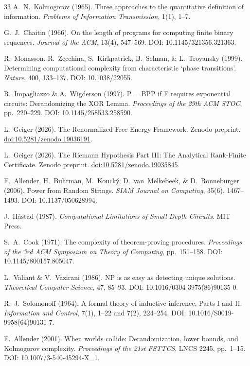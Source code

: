 \documentclass[aps,prd,twocolumn,superscriptaddress,nofootinbib]{revtex4-2}
\theoremstyle{definition}
\theoremstyle{remark}
\begin{document}
\begin{thebibliography}{33}
A.~N.~Kolmogorov (1965).
Three approaches to the quantitative definition of information.
\textit{Problems of Information Transmission}, 1(1), 1--7.

G.~J.~Chaitin (1966).
On the length of programs for computing finite binary sequences.
\textit{Journal of the ACM}, 13(4), 547--569.
DOI: 10.1145/321356.321363.

R.~Monasson, R.~Zecchina, S.~Kirkpatrick, B.~Selman, \& L.~Troyansky (1999).
Determining computational complexity from characteristic `phase transitions'.
\textit{Nature}, 400, 133--137.
DOI: 10.1038/22055.

R.~Impagliazzo \& A.~Wigderson (1997).
P = BPP if E requires exponential circuits: Derandomizing the XOR Lemma.
\textit{Proceedings of the 29th ACM STOC}, pp.\ 220--229.
DOI: 10.1145/258533.258590.

L.~Geiger (2026).
The Renormalized Free Energy Framework.
Zenodo preprint.
\href{https://doi.org/10.5281/zenodo.19036191}{doi:10.5281/zenodo.19036191}.

L.~Geiger (2026).
The Riemann Hypothesis Part III: The Analytical Rank-Finite Certificate.
Zenodo preprint.
\href{https://doi.org/10.5281/zenodo.19035845}{doi:10.5281/zenodo.19035845}.

E.~Allender, H.~Buhrman, M.~Kouck\'y, D.~van~Melkebeek, \& D.~Ronneburger (2006).
Power from Random Strings.
\textit{SIAM Journal on Computing}, 35(6), 1467--1493.
DOI: 10.1137/050628994.

J.~H\r{a}stad (1987).
\textit{Computational Limitations of Small-Depth Circuits}.
MIT Press.

S.~A.~Cook (1971).
The complexity of theorem-proving procedures.
\textit{Proceedings of the 3rd ACM Symposium on Theory of Computing}, pp.\ 151--158.
DOI: 10.1145/800157.805047.

L.~Valiant \& V.~Vazirani (1986).
NP is as easy as detecting unique solutions.
\textit{Theoretical Computer Science}, 47, 85--93.
DOI: 10.1016/0304-3975(86)90135-0.

R.~J.~Solomonoff (1964).
A formal theory of inductive inference, Parts I and II.
\textit{Information and Control}, 7(1), 1--22 and 7(2), 224--254.
DOI: 10.1016/S0019-9958(64)90131-7.

E.~Allender (2001).
When worlds collide: Derandomization, lower bounds, and Kolmogorov complexity.
\textit{Proceedings of the 21st FSTTCS}, LNCS 2245, pp.\ 1--15.
DOI: 10.1007/3-540-45294-X\_1.


\end{thebibliography}
\end{document}
